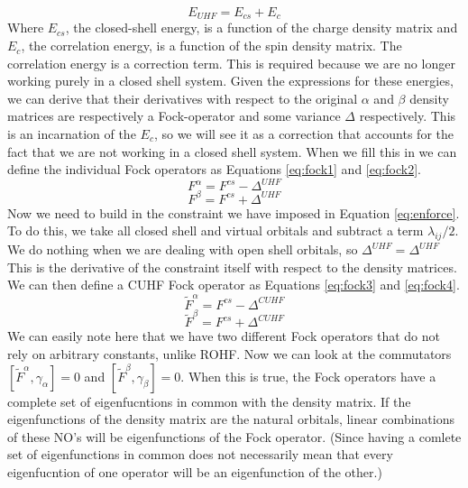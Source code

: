 \documentclass{article}
\begin{document}
\begin{equation}\label{eq:energy1}
    E_{UHF} = E_{cs} + E_{c}
\end{equation}
Where $E_{cs}$, the closed-shell energy, is a function of the charge density matrix and $E_c$, the correlation energy, is a function of the spin density matrix. The correlation energy
 is a correction term. This is required because we are no longer working purely in a closed shell system. Given the expressions for these energies, we can derive that their 
 derivatives with respect to the original $\alpha$ and $\beta$ density matrices are respectively a Fock-operator and some variance $\Delta$ respectively. This is an incarnation of 
 the $E_c$, so we will see it as a correction that accounts for the fact that we are not working in a closed shell system.  When we fill this in we can define the individual Fock 
 operators as Equations \eqref{eq:fock1} and \eqref{eq:fock2}.
\begin{equation}\label{eq:fock1}
    F^\alpha = F^{cs} - \Delta^{UHF}
\end{equation}
\begin{equation}\label{eq:fock2}
    F^\beta = F^{cs} + \Delta^{UHF}
\end{equation}
Now we need to build in the constraint we have imposed in Equation \eqref{eq:enforce}. To do this, we take all closed shell and virtual orbitals and subtract a term $\lambda_{ij}/2$.
We do nothing when we are dealing with open shell orbitals, so $\Delta^{UHF} = \Delta^{UHF}$ This is the derivative of the constraint itself with respect to the density matrices.
We can then define a CUHF Fock operator as Equations \eqref{eq:fock3} and \eqref{eq:fock4}.
\begin{equation}\label{eq:fock3}
    \widetilde{F}^\alpha = F^{cs} - \Delta^{CUHF}
\end{equation}
\begin{equation}\label{eq:fock4}
    \widetilde{F}^\beta = F^{cs} + \Delta^{CUHF}
\end{equation}
We can easily note here that we have two different Fock operators that do not rely on arbitrary constants, unlike ROHF. Now we can look at the commutators 
$[\widetilde{F}^\alpha, \gamma_\alpha] = 0$ and $[\widetilde{F}^\beta, \gamma_\beta] = 0$. When this is true, the Fock operators have a complete set of eigenfucntions in common with 
the density matrix. If the eigenfunctions of the density matrix are  the natural orbitals, linear combinations of these NO's will be eigenfunctions of the Fock operator. 
(Since having a comlete set of eigenfunctions in common does not necessarily mean that every eigenfucntion of one operator will be an eigenfunction of the other.) 
\end{document}
